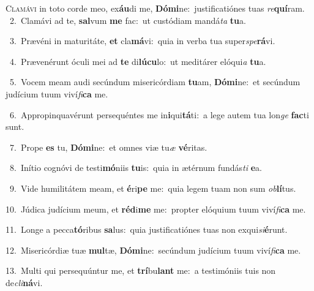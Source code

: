 \lettrine{\initial\textcolor{\initialcolor}{C}}{lamávi} in toto corde meo, ex\-\textbf{áu}\-di me, \textbf{Dó}\-\textbf{mi}ne:~\star justificatiónes tuas \textit{re}\-\textbf{quí}ram.\\
{\numbfont\textcolor{\numbcolor}{~2.}}~Clamávi ad te, \textbf{sal}\-vum \textbf{me} fac:~\star ut custódiam mandá\textit{ta} \textbf{tu}\-a.\par
{\numbfont\textcolor{\numbcolor}{~3.}}~Prævéni in maturitáte, \textbf{et} cla\-\textbf{má}\-vi:~\star quia in verba tua super\-\textit{spe}\-\textbf{rá}vi.\par
{\numbfont\textcolor{\numbcolor}{~4.}}~Prævenérunt óculi mei ad \textbf{te} di\-\textbf{lú}\-\textbf{cu}lo:~\star ut meditárer elóqui\textit{a} \textbf{tu}\-a.\par
{\numbfont\textcolor{\numbcolor}{~5.}}~Vocem meam audi secúndum misericórdiam \textbf{tu}\-am, \textbf{Dó}\-\textbf{mi}ne:~\star et secúndum judícium tuum viví\-\textit{fi}\-\textbf{ca} me.\par
{\numbfont\textcolor{\numbcolor}{~6.}}~Appropinquavérunt persequéntes me in\-\textbf{i}\-qui\-\textbf{tá}\-ti:~\star a lege autem tua lon\textit{ge} \textbf{fac}\-ti sunt.\par
{\numbfont\textcolor{\numbcolor}{~7.}}~Prope \textbf{es} tu, \textbf{Dó}\-\textbf{mi}ne:~\star et omnes viæ tu\textit{æ} \textbf{vé}\-ritas.\par
{\numbfont\textcolor{\numbcolor}{~8.}}~Inítio cognóvi de testi\-\textbf{mó}\-niis \textbf{tu}\-is:~\star quia in ætérnum fundás\textit{ti} \textbf{e}\-a.\par
{\numbfont\textcolor{\numbcolor}{~9.}}~Vide humilitátem meam, et \textbf{é}\-ri\textbf{pe} me:~\star quia legem tuam non sum \textit{ob}\-\textbf{lí}tus.\par
{\numbfont\textcolor{\numbcolor}{10.}}~Júdica judícium meum, et \textbf{réd}\-i\textbf{me} me:~\star propter elóquium tuum viví\-\textit{fi}\-\textbf{ca} me.\par
{\numbfont\textcolor{\numbcolor}{11.}}~Longe a pecca\-\textbf{tó}\-ribus \textbf{sa}\-lus:~\star quia justificatiónes tuas non exqui\-\textit{si}\-\textbf{é}runt.\par
{\numbfont\textcolor{\numbcolor}{12.}}~Misericórdiæ tuæ \textbf{mul}\-tæ, \textbf{Dó}\-\textbf{mi}ne:~\star secúndum judícium tuum viví\-\textit{fi}\-\textbf{ca} me.\par
{\numbfont\textcolor{\numbcolor}{13.}}~Multi qui persequúntur me, et \textbf{trí}\-bu\textbf{lant} me:~\star a testimóniis tuis non de\-\textit{cli}\-\textbf{ná}vi.\par
